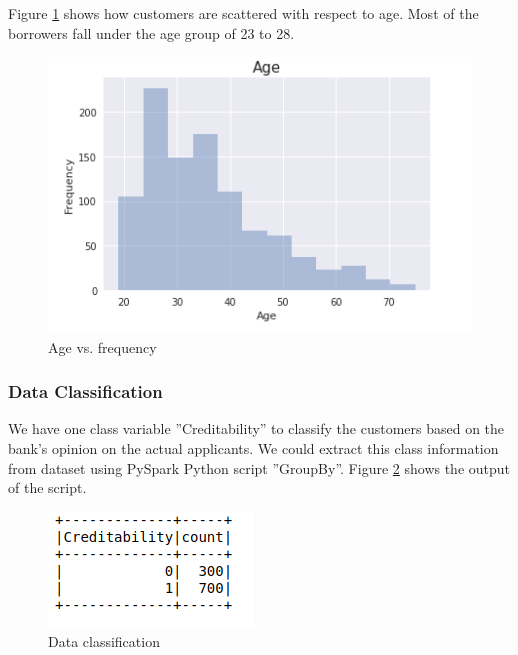 \documentclass[sigconf]{acmart}
\begin{document}
Figure \ref{fig:Figure13} shows how customers are scattered with respect to age. Most of the borrowers fall under the age group of 23 to 28.

\begin{figure}[htb]
  \centering
  \includegraphics[width=1.0\columnwidth]{images/Figure13.png}
  \caption{Age vs. frequency}
  \label{fig:Figure13} 
\end{figure}

\subsubsection{Data Classification}\label{Data Classification}

We have one class variable ''Creditability'' to classify the customers based on the bank's opinion on the actual applicants. We could extract this class information from dataset using PySpark Python script ''GroupBy''. Figure \ref{fig:Figure14} shows the output of the script.

\begin{figure}[htb]
  \centering
  \includegraphics[width=1.0\columnwidth]{images/Figure14.png}
  \caption{Data classification}
  \label{fig:Figure14} 
\end{figure}
\end{document}
